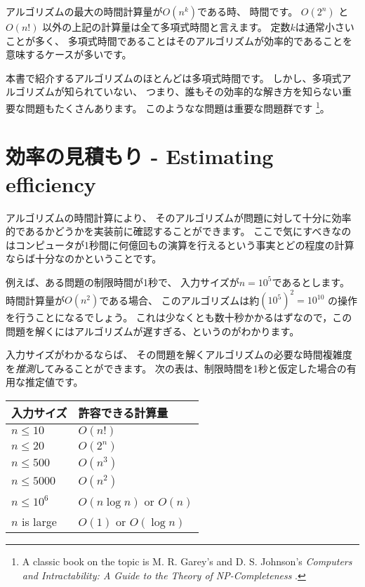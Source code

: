 アルゴリズムの最大の時間計算量が$O(n^k)$である時、
 時間です。
$O(2^n)$ と $O(n!)$ 以外の上記の計算量は全て多項式時間と言えます。
定数$k$は通常小さいことが多く、
多項式時間であることはそのアルゴリズムが効率的であることを意味するケースが多いです。


本書で紹介するアルゴリズムのほとんどは多項式時間です。
しかし、多項式アルゴリズムが知られていない、
つまり、誰もその効率的な解き方を知らない重要な問題もたくさんあります。
このようなな問題は重要な問題群です
\footnote{A classic book on the topic is
M. R. Garey's and D. S. Johnson's
\emph{Computers and Intractability: A Guide to the Theory
of NP-Completeness} \cite{gar79}.}。

\section{効率の見積もり - Estimating efficiency}

アルゴリズムの時間計算により、
そのアルゴリズムが問題に対して十分に効率的であるかどうかを実装前に確認することができます。
ここで気にすべきなのはコンピュータが1秒間に何億回もの演算を行えるという事実とどの程度の計算ならば十分なのかということです。

例えば、ある問題の制限時間が1秒で、
入力サイズが$n=10^5$であるとします。
時間計算量が$O(n^2)$である場合、
このアルゴリズムは約$(10^5)^2=10^{10}$ の操作を行うことになるでしょう。
これは少なくとも数十秒かかるはずなので，この問題を解くにはアルゴリズムが遅すぎる、というのがわかります。

入力サイズがわかるならば、
その問題を解くアルゴリズムの必要な時間複雑度を\emph{推測}してみることができます。
次の表は、制限時間を1秒と仮定した場合の有用な推定値です。

\begin{center}
\begin{tabular}{ll}
入力サイズ & 許容できる計算量 \\
\hline
$n \le 10$ & $O(n!)$ \\
$n \le 20$ & $O(2^n)$ \\
$n \le 500$ & $O(n^3)$ \\
$n \le 5000$ & $O(n^2)$ \\
$n \le 10^6$ & $O(n \log n)$ or $O(n)$ \\
$n$ is large & $O(1)$ or $O(\log n)$ \\
\end{tabular}
\end{center}

